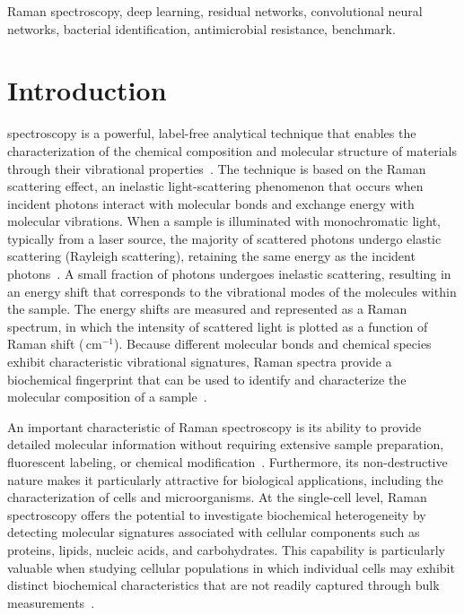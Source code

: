 \documentclass[journal,onecolumn]{IEEEtran}
\newcommand{\wn}{\,cm$^{-1}$}              %
\begin{document}
\begin{IEEEkeywords}
Raman spectroscopy, deep learning, residual networks, convolutional neural
networks, bacterial identification, antimicrobial resistance, benchmark.
\end{IEEEkeywords}

\section{Introduction}
\label{sec:intro}

 spectroscopy is a powerful, label-free analytical
technique that enables the characterization of the chemical composition and
molecular structure of materials through their vibrational
properties~\cite{smith2019modern}. The technique is based on the Raman
scattering effect, an inelastic light-scattering phenomenon that occurs when
incident photons interact with molecular bonds and exchange energy with
molecular vibrations. When a sample is illuminated with monochromatic light,
typically from a laser source, the majority of scattered photons undergo
elastic scattering (Rayleigh scattering), retaining the same energy as the
incident photons~\cite{smith2019modern}. A small fraction of photons
undergoes inelastic scattering, resulting in an energy shift that corresponds
to the vibrational modes of the molecules within the sample. The energy shifts
are measured and represented as a Raman spectrum, in which the intensity of
scattered light is plotted as a function of Raman shift (\wn). Because
different molecular bonds and chemical species exhibit characteristic
vibrational signatures, Raman spectra provide a biochemical fingerprint that
can be used to identify and characterize the molecular composition of a
sample~\cite{smith2019modern}.

An important characteristic of Raman spectroscopy is its ability to provide
detailed molecular information without requiring extensive sample
preparation, fluorescent labeling, or chemical
modification~\cite{yi2025surface}. Furthermore, its non-destructive nature
makes it particularly attractive for biological applications, including the
characterization of cells and microorganisms. At the single-cell level, Raman
spectroscopy offers the potential to investigate biochemical heterogeneity by
detecting molecular signatures associated with cellular components such as
proteins, lipids, nucleic acids, and carbohydrates. This capability is
particularly valuable when studying cellular populations in which individual
cells may exhibit distinct biochemical characteristics that are not readily
captured through bulk measurements~\cite{zhang2024genotype}.
\end{document}
